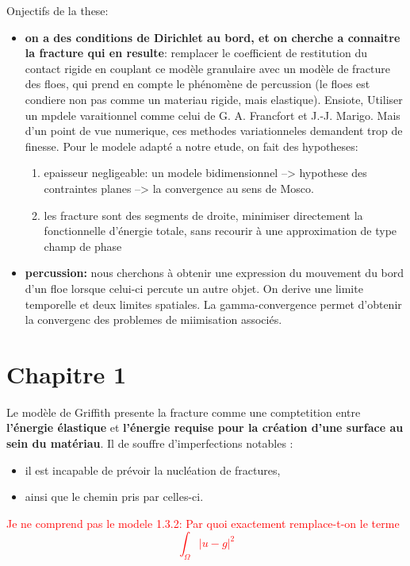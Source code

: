 \documentclass[
  french,
	10pt, %
]{fphw}
\begin{document}
Onjectifs de la these:
\begin{itemize}
  \item \textbf{on a des conditions de Dirichlet au bord, et on cherche a connaitre la fracture qui en resulte}: remplacer le coefficient de restitution du contact rigide en couplant ce modèle granulaire avec un modèle de fracture des floes, qui prend en compte le phénomène de percussion (le floes est condiere non pas comme un materiau rigide, mais elastique).
  Ensiote, Utiliser un mpdele varaitionnel comme celui de G. A. Francfort et J.-J. Marigo. Mais d'un point de vue numerique, ces methodes variationneles demandent trop de finesse. Pour le modele adapté a notre etude, on fait des hypotheses:
  \begin{enumerate}
    \item epaisseur negligeable:  un modele bidimensionnel --> hypothese des contraintes planes --> la convergence au sens de Mosco.
    \item les fracture sont des segments de droite, minimiser directement la fonctionnelle d’énergie totale, sans recourir à une approximation de type champ de phase
  \end{enumerate}
  \item \textbf{percussion:} nous cherchons à obtenir une expression du mouvement du bord d’un floe lorsque celui-ci percute un autre objet. On derive une limite temporelle et deux limites spatiales. La gamma-convergence permet d'obtenir la convergenc des problemes de miimisation associés.
\end{itemize}



\section{Chapitre 1}

Le modèle de Griffith presente la fracture comme une comptetition entre \textbf{l’énergie élastique} et \textbf{l’énergie requise pour la création d’une surface au sein du matériau}. Il de souffre d’imperfections
notables :
\begin{itemize}
  \item il est incapable de prévoir la nucléation de fractures, 
  \item ainsi que le chemin pris par celles-ci.
\end{itemize}

\textcolor{red}{
Je ne comprend pas le modele 1.3.2: Par quoi exactement remplace-t-on le terme $$\int_{\Omega} \vert u-g \vert^2$$
}
\end{document}
